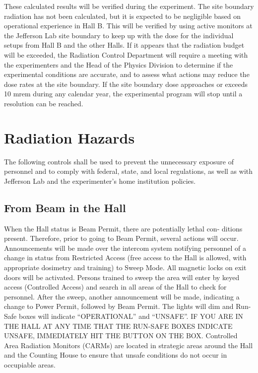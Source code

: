 \documentclass[12pt]{article}
\begin{document}
      These calculated results will be verified during the experiment. The site
boundary radiation has not been calculated, but it is expected to be negligible
based on operational experience in Hall B. This will be verified by using
active monitors at the Jefferson Lab site boundary to keep up with the dose
for the individual setups from Hall B and the other Halls. If it appears that
the radiation budget will be exceeded, the Radiation Control Department
will require a meeting with the experimenters and the Head of the Physics
Division to determine if the experimental conditions are accurate, and to
assess what actions may reduce the dose rates at the site boundary. If the
site boundary dose approaches or exceeds 10 mrem during any calendar year,
the experimental program will stop until a resolution can be reached.

\section{Radiation Hazards}
The following controls shall be used to prevent the unnecessary exposure
of personnel and to comply with federal, state, and local regulations, as well
as with Jefferson Lab and the experimenter’s home institution policies.

\subsection{From Beam in the Hall}
When the Hall status is Beam Permit, there are potentially lethal con-
ditions present. Therefore, prior to going to Beam Permit, several actions
will occur. Announcements will be made over the intercom system notifying
personnel of a change in status from Restricted Access (free access to the
Hall is allowed, with appropriate dosimetry and training) to Sweep Mode.
All magnetic locks on exit doors will be activated. Persons trained to sweep
the area will enter by keyed access (Controlled Access) and search in all areas
of the Hall to check for personnel.
After the sweep, another announcement will be made, indicating a change
to Power Permit, followed by Beam Permit. The lights will dim and Run-Safe
boxes will indicate “OPERATIONAL” and “UNSAFE”. IF YOU ARE IN
THE HALL AT ANY TIME THAT THE RUN-SAFE BOXES INDICATE
UNSAFE, IMMEDIATELY HIT THE BUTTON ON THE BOX.
Controlled Area Radiation Monitors (CARMs) are located in strategic areas 
around the Hall and the Counting House to ensure that unsafe conditions
do not occur in occupiable areas.
\end{document}

